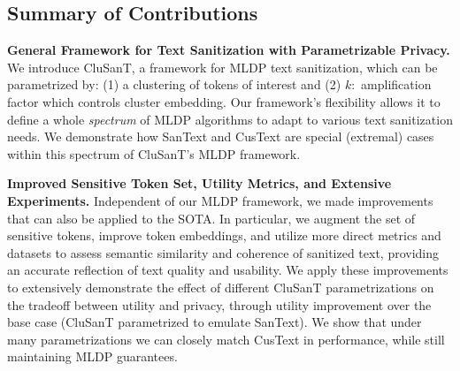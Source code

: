 \documentclass[11pt]{article}
\newcommand{\clusant}{CluSanT\xspace}
\begin{document}
\subsection{Summary of Contributions}

\noindent
\textbf{General Framework for Text Sanitization with Parametrizable Privacy. }  
    We introduce \clusant, a framework for MLDP text sanitization, which can be parametrized by: (1) a clustering of tokens of interest and (2) $k:$ amplification factor which controls cluster embedding. 
    Our framework's flexibility allows it to define a whole {\em spectrum} of MLDP algorithms to adapt to various text sanitization needs. 
    We demonstrate how SanText and CusText are special (extremal) cases within this spectrum of \clusant's MLDP framework.

\vspace{0.5em}
\noindent
\textbf{Improved Sensitive Token Set, Utility Metrics, and Extensive Experiments.} 
Independent of our MLDP framework, we made improvements that can also be applied to the SOTA. In particular, we augment the set of sensitive tokens, improve token embeddings, and utilize more direct metrics and datasets to assess semantic similarity and coherence of sanitized text, providing an accurate reflection of text quality and usability. 
We apply these improvements to extensively demonstrate the effect of different \clusant parametrizations on the tradeoff between  utility and privacy, through utility improvement over the base case (\clusant parametrized to emulate SanText). We show that under many parametrizations  we can closely match CusText in performance, while still maintaining MLDP guarantees.
    
    
\end{document}
